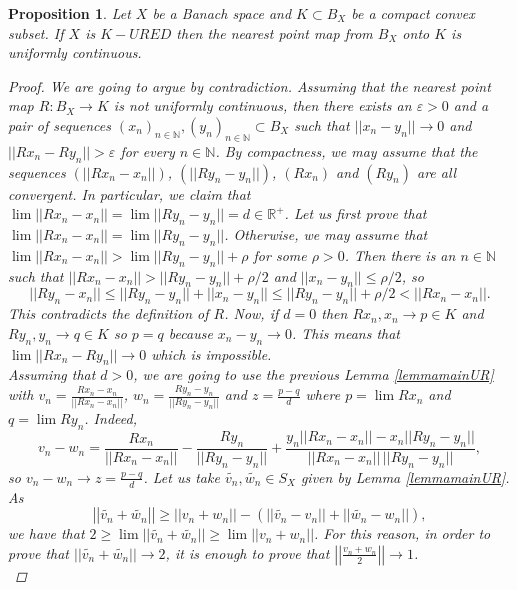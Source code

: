 \documentclass[11pt]{amsart}
\newcommand{\ep}{\varepsilon}
\newcommand{\N}{\mathbb{N}}
\newcommand{\R}{\mathbb{R}}
\newcommand{\<}{\langle}
\renewcommand{\>}{\rangle}
\newtheorem{prop}[theorem]{Proposition}
\theoremstyle{definition}
\theoremstyle{remark}
\numberwithin{equation}{section}
\def\R{{\mathbb R}}
\begin{document}
\begin{prop}\label{mainpropUR}
Let $X$ be a Banach space and $K\subset B_X$ be a compact convex subset. If $X$ is $K-URED$ then the nearest point map from $B_X$ onto $K$ is uniformly continuous.
\begin{proof}
We are going to argue by contradiction.
Assuming that the nearest point map $R:B_X\rightarrow K$ is not uniformly continuous, then there exists an $\ep>0$ and a pair of sequences $(x_n)_{n\in\N},(y_n)_{n\in\N}\subset B_X$ such that $||x_n-y_n||\rightarrow 0$ and $||Rx_n-Ry_n||>\ep$ for every $n\in\N$.
By compactness, we may assume that the sequences $(||Rx_n-x_n||)$, $(||Ry_n-y_n||)$, $(Rx_n)$ and $(Ry_n)$ are all convergent. In particular, we claim that $\lim ||Rx_n-x_n||=\lim||Ry_n-y_n||=d\in\R^+$.
Let us first prove that $\lim ||Rx_n-x_n||=\lim||Ry_n-y_n||$. Otherwise, we may assume that $\lim||Rx_n-x_n||>\lim||Ry_n-y_n||+\rho$ for some $\rho>0$. Then there is an $n\in\N$ such that $||Rx_n-x_n||>||Ry_n-y_n||+\rho/2$ and $||x_n-y_n||\le\rho/2$, so
$$||Ry_n-x_n||\le||Ry_n-y_n||+||x_n-y_n||\le||Ry_n-y_n||+\rho/2<||Rx_n-x_n||.$$
This contradicts the definition of $R$. Now, if $d=0$ then $Rx_n,x_n\rightarrow p\in K$ and $Ry_n,y_n\rightarrow q\in K$ so $p=q$ because $x_n-y_n\rightarrow 0$. This means that $\lim||Rx_n-Ry_n||\rightarrow 0$ which is  impossible.\\

Assuming that $d>0$, we are going to use the previous Lemma \ref{lemmamainUR} with $v_n=\frac{Rx_n-x_n}{||Rx_n-x_n||}$, $w_n=\frac{Ry_n-y_n}{||Ry_n-y_n||}$ and $z=\frac{p-q}{d}$ where $p=\lim Rx_n$ and $q=\lim Ry_n$. Indeed,
$$v_n-w_n=\frac{Rx_n}{||Rx_n-x_n||}-\frac{Ry_n}{||Ry_n-y_n||}+\frac{y_n||Rx_n-x_n||-x_n||Ry_n-y_n||}{||Rx_n-x_n||\,||Ry_n-y_n||},$$
so $v_n-w_n\rightarrow z=\frac{p-q}{d}$. Let us take $\widetilde{v_n}, \widetilde{w_n}\in S_X$ given by Lemma \ref{lemmamainUR}. As
$$\left|\left| \widetilde{v_n}+\widetilde{w_n} \right|\right|\ge||v_n+w_n||-(||\widetilde{v_n}-v_n||+||\widetilde{w_n}-w_n||),$$
we have that $2\ge\lim||\widetilde{v_n}+\widetilde{w_n}||\ge\lim||v_n+w_n||$. For this reason, in order to prove that $||\widetilde{v_n}+\widetilde{w_n}||\rightarrow 2$, it is enough to prove that $\left|\left|\frac{{v_n}+{w_n}}{2} \right|\right|\rightarrow 1$.\\


\end{proof}
\end{prop}
\end{document}
